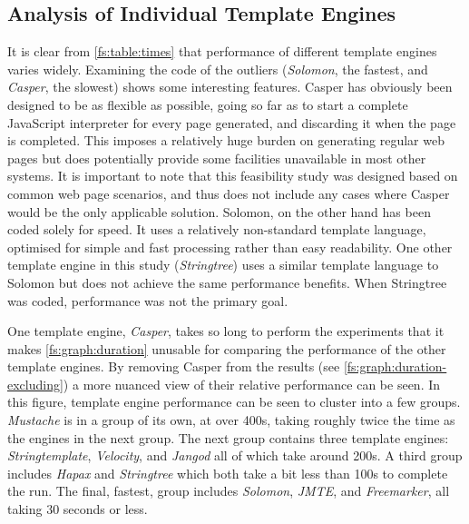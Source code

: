 \subsection{Analysis of Individual Template Engines}

It is clear from \autoref{fs:table:times} that performance of different template engines varies widely. Examining the code of the outliers (\emph{Solomon}, the fastest, and \emph{Casper}, the slowest) shows some interesting features. Casper has obviously been designed to be as flexible as possible, going so far as to start a complete JavaScript interpreter for every page generated, and discarding it when the page is completed. This imposes a relatively huge burden on generating regular web pages but does potentially provide some facilities unavailable in most other systems. It is important to note that this feasibility study was designed based on common web page scenarios, and thus does not include any cases where Casper would be the only applicable solution. Solomon, on the other hand has been coded solely for speed. It uses a relatively non-standard template language, optimised for simple and fast processing rather than easy readability. One other template engine in this study (\emph{Stringtree}) uses a similar template language to Solomon but does not achieve the same performance benefits. When Stringtree was coded, performance was not the primary goal.

One template engine, \emph{Casper}, takes so long to perform the experiments that it makes \autoref{fs:graph:duration} unusable for comparing the performance of the other template engines. By removing Casper from the results (see \autoref{fs:graph:duration-excluding}) a more nuanced view of their relative performance can be seen. In this figure, template engine performance can be seen to cluster into a few groups. \emph{Mustache} is in a group of its own, at over 400s, taking roughly twice the time as the engines in the next group. The next group contains three template engines: \emph{Stringtemplate}, \emph{Velocity}, and \emph{Jangod} all of which take around 200s. A third group includes \emph{Hapax} and \emph{Stringtree} which both take a bit less than 100s to complete the run. The final, fastest, group includes \emph{Solomon}, \emph{JMTE}, and \emph{Freemarker}, all taking 30 seconds or less.

